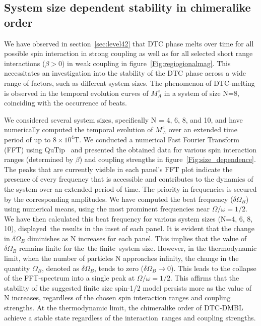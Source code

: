 \documentclass[12pt]{iopart}
\begin{document}
\subsection{\label{sec:level43} System size dependent stability in chimeralike order}
We have observed in section~\ref{sec:level42} that DTC phase melts over time for all possible spin interaction in strong coupling as well as for all selected short range interactions ($\beta > 0$) in weak coupling in figure~\ref{Fig:regiogionalmag}. This necessitates  an investigation into the stability of the DTC phase across a wide range of factors, such as different system sizes. The phenomenon of DTC-melting is observed in the temporal evolution curves of $M^z_A$ in a system of size N=8, coinciding with the occurrence of beats. 

We considered several system sizes, specifically N = 4, 6, 8, and 10, and have numerically computed the temporal evolution of $M^z_A$ over an extended time period of up to $8\times10^4$T. We conducted a numerical Fast Fourier Transform (FFT) using QuTip~\cite{Johansson2013} and presented the obtained data for various spin interaction ranges (determined by $\beta$) and coupling strengths in figure~\ref{Fig:size_dependence}. The peaks that are currently visible in each panel's FFT plot indicate the presence of every frequency that is accessible and contributes to the dynamics of the system over an extended period of time. The priority in frequencies is secured by the corresponding amplitudes. We have computed the beat frequency ($\delta\Omega_B$) using numerical means, using the most prominent frequencies near $\Omega/\omega = 1/2$. We have then calculated this beat frequency for various system sizes (N=4, 6, 8, 10), displayed the results in the inset of each panel. It is evident that the change in $\delta\Omega_B$ diminishes as N increases for each panel. This implies that the value of $\delta\Omega_B$ remains finite for the the finite system size. However, in the thermodynamic limit, when the number of particles N approaches infinity, the change in the quantity $\Omega_B$, denoted as $\delta\Omega_B$, tends to zero ($\delta\Omega_B\rightarrow 0$). This leads to the collapse of the FFT-spectrum into a single peak at $\Omega/\omega = 1/2$. This affirms that the stability of the suggested finite size spin-1/2 model persists more as the value of N increases, regardless of the chosen spin interaction ranges and coupling strengths. At the thermodynamic limit, the chimeralike order of DTC-DMBL achieve a stable state regardless of the interaction ranges and coupling strengths.
\end{document}
